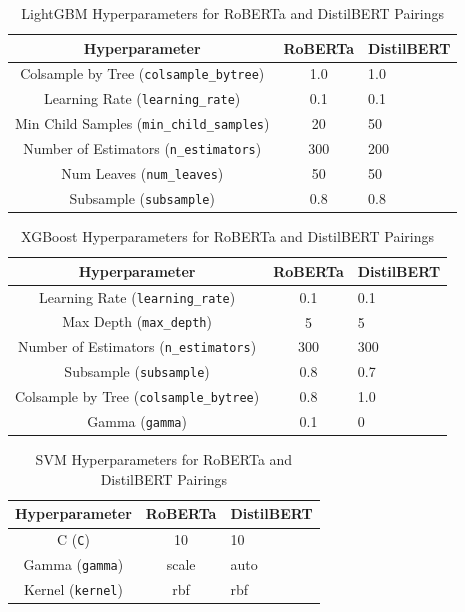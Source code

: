 \documentclass[sigconf,review]{acmart}
\begin{document}
\begin{table}
  \caption{LightGBM Hyperparameters for RoBERTa and DistilBERT Pairings}
  \label{tab:lgbm_hyperparameters}
  \begin{tabular}{ccl}
    \toprule
    Hyperparameter & RoBERTa & DistilBERT \\
    \midrule
    Colsample by Tree (\texttt{colsample\_bytree}) & 1.0 & 1.0 \\
    Learning Rate (\texttt{learning\_rate})        & 0.1 & 0.1 \\
    Min Child Samples (\texttt{min\_child\_samples}) & 20 & 50 \\
    Number of Estimators (\texttt{n\_estimators})  & 300 & 200 \\
    Num Leaves (\texttt{num\_leaves})              & 50  & 50 \\
    Subsample (\texttt{subsample})                 & 0.8 & 0.8 \\
    \bottomrule
  \end{tabular}
\end{table}

\begin{table}
  \caption{XGBoost Hyperparameters for RoBERTa and DistilBERT Pairings}
  \label{tab:xgb_hyperparameters}
  \begin{tabular}{ccl}
    \toprule
    Hyperparameter & RoBERTa & DistilBERT \\
    \midrule
    Learning Rate (\texttt{learning\_rate})  & 0.1 & 0.1 \\
    Max Depth (\texttt{max\_depth})          & 5   & 5 \\
    Number of Estimators (\texttt{n\_estimators}) & 300 & 300 \\
    Subsample (\texttt{subsample})           & 0.8 & 0.7 \\
    Colsample by Tree (\texttt{colsample\_bytree}) & 0.8 & 1.0 \\
    Gamma (\texttt{gamma})                   & 0.1 & 0 \\
    \bottomrule
  \end{tabular}
\end{table}

\begin{table}
  \caption{SVM Hyperparameters for RoBERTa and DistilBERT Pairings}
  \label{tab:svm_hyperparameters}
  \begin{tabular}{ccl}
    \toprule
    Hyperparameter & RoBERTa & DistilBERT \\
    \midrule
    C (\texttt{C})          & 10   & 10 \\
    Gamma (\texttt{gamma})  & scale & auto \\
    Kernel (\texttt{kernel}) & rbf  & rbf \\
    \bottomrule
  \end{tabular}
\end{table}
\end{document}
